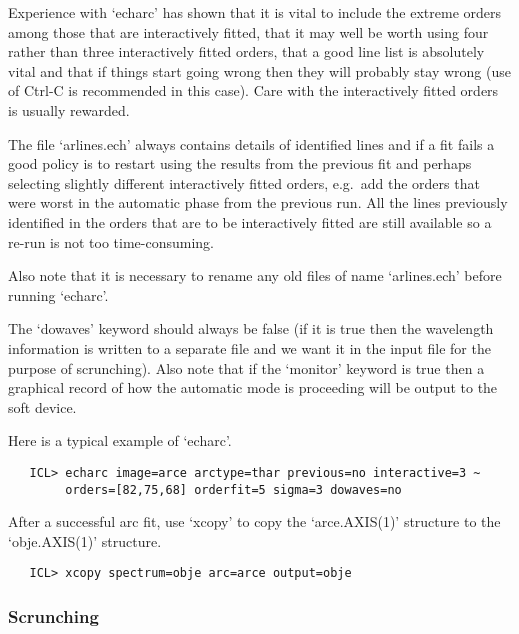    Experience with `echarc' has shown that it is vital to include the
   extreme orders among those that are interactively fitted, that it may
   well be worth using four rather than three interactively fitted
   orders, that a good line list is absolutely vital and that if things
   start going wrong then they will probably stay wrong (use of Ctrl-C
   is recommended in this case). Care with the interactively fitted
   orders is usually rewarded.

   The file `arlines.ech' always contains details of identified lines
   and if a fit fails a good policy is to restart using the results from
   the previous fit and perhaps selecting slightly different
   interactively fitted orders, e.g.\ add the orders that were worst in
   the automatic phase from the previous run. All the lines previously
   identified in the orders that are to be interactively fitted are
   still available so a re-run is not too time-consuming.

   Also note that it is necessary to rename any old files of name
   `arlines.ech' before running `echarc'.

   The `dowaves' keyword should always be false (if it is true then the
   wavelength information is written to a separate file and we want it
   in the input file for the purpose of scrunching). Also note that if
   the `monitor' keyword is true then a graphical record of how the
   automatic mode is proceeding will be output to the soft device.

   Here is a typical example of `echarc'.

\begin{verbatim}
   ICL> echarc image=arce arctype=thar previous=no interactive=3 ~
        orders=[82,75,68] orderfit=5 sigma=3 dowaves=no
\end{verbatim}

   After a successful arc fit, use `xcopy' to copy the `arce.AXIS(1)'
   structure to the `obje.AXIS(1)' structure.

\begin{verbatim}
   ICL> xcopy spectrum=obje arc=arce output=obje
\end{verbatim}


\subsubsection{\label{techno13scrunch}Scrunching}

